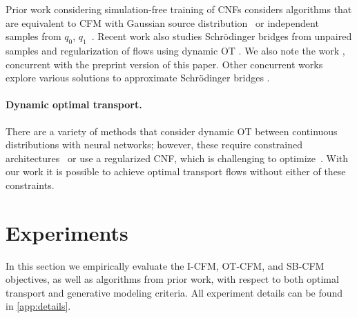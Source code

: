 \documentclass[10pt]{article}
\theoremstyle{plain}
\theoremstyle{definition}
\theoremstyle{remark}
\begin{document}
Prior work considering simulation-free training of CNFs considers algorithms that are equivalent to CFM with Gaussian source distribution~\citep{rozen_moser_2021,ben-hamu_matching_2022,lipman_flow_2022} or independent samples from $q_0$, $q_1$~\citep{albergo_building_2023,albergo_stochastic_2023,neklyudov_action_2022}. Recent work also studies Schr\"odinger bridges from unpaired samples \citep{shi_conditional_2022} and regularization of flows using dynamic OT \citep{liu_flow_2023}. {We also note the  work \citet{pooladian_2023_multisample}, concurrent with the preprint version of this paper. Other concurrent works explore various solutions to approximate Schr\"odinger bridges \citep{somnath2023aligned, shi2023diffusion, liu_sb_2023}.}

\paragraph{Dynamic optimal transport.} There are a variety of methods that consider dynamic OT between continuous distributions with neural networks; however, these require constrained architectures~\citep{leygonie_adversarial_2019,makkuva_optimal_2020,bunne_proximal_2022} or use a regularized CNF, which is challenging to optimize~\citep{tong_trajectorynet_2020,finlay_how_2020,onken_ot-flow_2021,huguet_manifold_2022}. With our work it is possible to achieve optimal transport flows without either of these constraints.

\section{Experiments}\label{sec:experiments}

In this section we empirically evaluate the I-CFM, OT-CFM, and SB-CFM objectives, as well as algorithms from prior work, with respect to both optimal transport and generative modeling criteria. All experiment details can be found in \autoref{app:details}.
\end{document}
